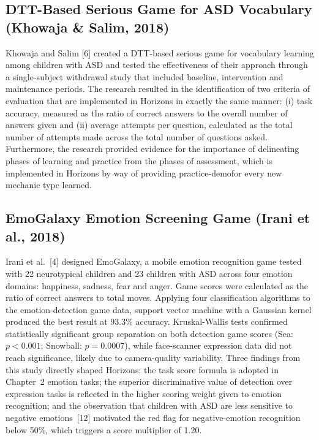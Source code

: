\documentclass[12pt,a4paper,oneside]{report}
\begin{document}
	\subsection{DTT-Based Serious Game for ASD Vocabulary (Khowaja \& Salim, 2018)}
	
	Khowaja and Salim [6] created a DTT-based serious game for vocabulary learning among children with ASD and tested the effectiveness of their approach through a single-subject withdrawal study that included baseline, intervention and maintenance periods. The research resulted in the identification of two criteria of evaluation that are implemented in Horizons in exactly the same manner: (i) task accuracy, measured as the ratio of correct answers to the overall number of answers given and (ii) average attempts per question, calculated as the total number of attempts made across the total number of questions asked. Furthermore, the research provided evidence for the importance of delineating phases of learning and practice from the phases of assessment, which is implemented in Horizons by way of providing practice-demofor every new mechanic type learned.
	
	\subsection{EmoGalaxy Emotion Screening Game (Irani et al., 2018)}
	
	Irani et al.~[4] designed EmoGalaxy, a mobile emotion recognition game tested with 22 neurotypical children and 23 children with ASD across four emotion domains: happiness, sadness, fear and anger. Game scores were calculated as the ratio of correct answers to total moves. Applying four classification algorithms to the emotion-detection game data, support vector machine with a Gaussian kernel produced the best result at 93.3\% accuracy. Kruskal-Wallis tests confirmed statistically significant group separation on both detection game scores (Sea: $p < 0.001$; Snowball: $p = 0.0007$), while face-scanner expression data did not reach significance, likely due to camera-quality variability. Three findings from this study directly shaped Horizons: the task score formula is adopted in Chapter~2 emotion tasks; the superior discriminative value of detection over expression tasks is reflected in the higher scoring weight given to emotion recognition; and the observation that children with ASD are less sensitive to negative emotions~[12] motivated the red flag for negative-emotion recognition below 50\%, which triggers a score multiplier of 1.20.
	
\end{document}
